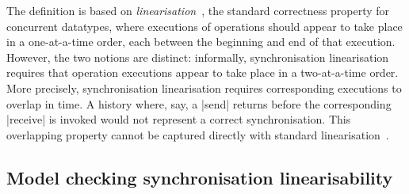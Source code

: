 

The definition is based on \emph{linearisation}~\cite{herlihy-wing}, the
standard correctness property for concurrent datatypes, where executions of
operations should appear to take place in a one-at-a-time order, each between
the beginning and end of that execution.  However, the two notions are
distinct: informally, synchronisation linearisation requires that operation
executions appear to take place in a two-at-a-time order.  More precisely,
synchronisation linearisation requires corresponding executions to overlap in
time.  A history where, say, a |send| returns before the corresponding
|receive| is invoked would not represent a correct synchronisation.  This
overlapping property cannot be captured directly with standard
linearisation~\cite{LL:synchronisation}.



\subsection{Model checking synchronisation linearisability}

